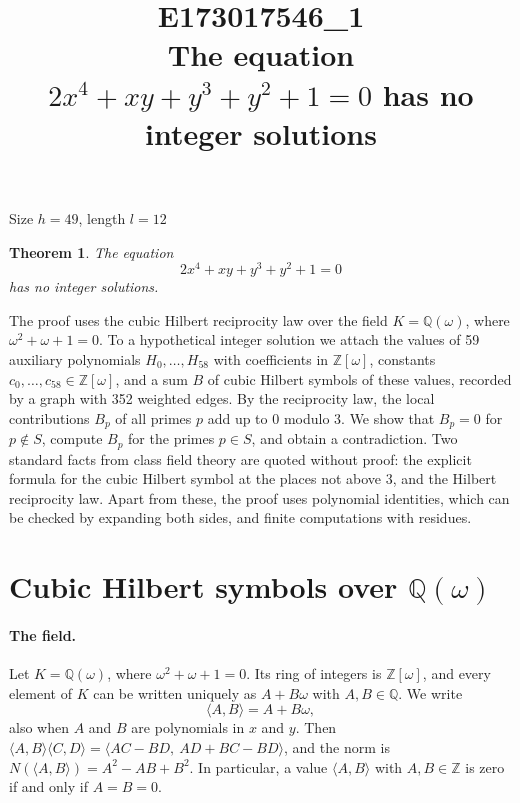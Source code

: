 \documentclass[11pt]{article}
\title{\textbf{E173017546\_1}\\[4pt] {\Large The equation $2x^{4}+xy+y^{3}+y^{2}+1=0$ has no integer solutions}}
\author{}
\date{}
\newtheorem{theorem}{Theorem}
\newcommand{\Z}{\mathbb{Z}}
\newcommand{\Q}{\mathbb{Q}}
\begin{document}
\maketitle
\vspace{-8ex}
\begin{center}
Size $h=49$, length $l=12$
\end{center}

\begin{theorem}\label{thm:main}
The equation
\begin{equation}\label{eq:main}
2x^{4}+xy+y^{3}+y^{2}+1=0
\end{equation}
has no integer solutions.
\end{theorem}

The proof uses the cubic Hilbert reciprocity law over the field $K=\Q(\omega)$, where $\omega^2+\omega+1=0$. To a hypothetical integer solution we attach the values of 59 auxiliary polynomials $H_0,\dots,H_{58}$ with coefficients in $\Z[\omega]$, constants $c_0,\dots,c_{58}\in\Z[\omega]$, and a sum $B$ of cubic Hilbert symbols of these values, recorded by a graph with 352 weighted edges. By the reciprocity law, the local contributions $B_p$ of all primes $p$ add up to $0$ modulo $3$. We show that $B_p=0$ for $p\notin S$, compute $B_p$ for the primes $p\in S$, and obtain a contradiction. Two standard facts from class field theory are quoted without proof: the explicit formula for the cubic Hilbert symbol at the places not above $3$, and the Hilbert reciprocity law. Apart from these, the proof uses polynomial identities, which can be checked by expanding both sides, and finite computations with residues.


\section{\texorpdfstring{Cubic Hilbert symbols over $\Q(\omega)$}{Cubic Hilbert symbols over Q(w)}}\label{sec:symbols}

\paragraph{The field.} Let $K=\Q(\omega)$, where $\omega^2+\omega+1=0$. Its ring of integers is $\Z[\omega]$, and every element of $K$ can be written uniquely as $A+B\omega$ with $A,B\in\Q$. We write
\[
\langle A,B\rangle=A+B\omega,
\]
also when $A$ and $B$ are polynomials in $x$ and $y$. Then $\langle A,B\rangle\langle C,D\rangle=\langle AC-BD,\ AD+BC-BD\rangle$, and the norm is $N(\langle A,B\rangle)=A^2-AB+B^2$. In particular, a value $\langle A,B\rangle$ with $A,B\in\Z$ is zero if and only if $A=B=0$.
\end{document}
